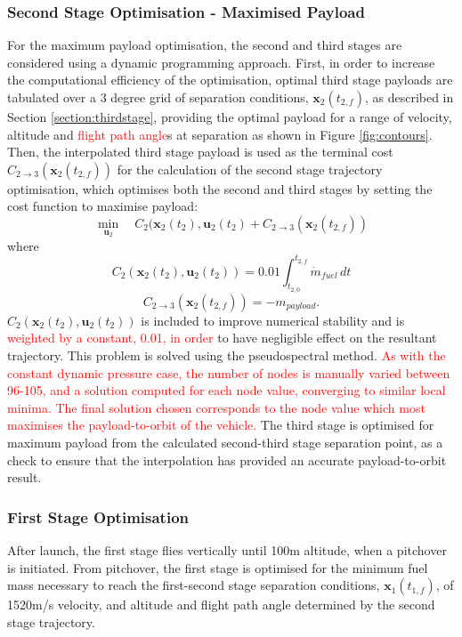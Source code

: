\documentclass[journal]{new-aiaa}
\begin{document}
	 	 \subsubsection{Second Stage Optimisation - Maximised Payload}
	 For the maximum payload optimisation, the second and third stages are considered using a dynamic programming approach. First, in order to increase the computational efficiency of the optimisation, optimal third stage payloads are tabulated  over a 3 degree grid of separation conditions, $\textbf{x}_2(t_{2,f})$, as described in Section \ref{section:thirdstage}, providing the optimal payload for a range of velocity, altitude and \textcolor{red}{flight path angle}s at separation as shown in Figure \ref{fig:contours}. Then, the interpolated third stage payload is used as the terminal cost $C_{2 \rightarrow 3}(\textbf{x}_2(t_{2,f}))$ for the calculation of the second stage trajectory optimisation, which optimises both the second and third stages by setting the cost function to maximise payload:
	  \begin{equation}
	  \min\limits_{\textbf{u}_2} \quad C_2(\textbf{x}_{2}(t_2),\textbf{u}_{2}(t_2) + C_{2 \rightarrow 3}(\textbf{x}_2 (t_{2,f}))
	  \end{equation}
	  where
	  \begin{equation}
	  C_2(\textbf{x}_{2}(t_2),\textbf{u}_{2}(t_2)) = 0.01\int_{t_{2,0}}^{t_{2,f}}\dot{m}_{fuel} \, dt
	  \end{equation}
	  \begin{equation}
	  C_{2 \rightarrow 3}(\textbf{x}_2(t_{2,f})) = -m_{payload}.
	  \end{equation}
	   $C_{2}(\textbf{x}_{2}(t_2),\textbf{u}_{2}(t_2))$ is included to improve numerical stability and is \textcolor{red}{weighted by a constant, 0.01, in order} to have negligible effect on the resultant trajectory.
	 This problem is solved using the pseudospectral method\cite{Ross2004}.  \textcolor{red}{As with the constant dynamic pressure case, the number of nodes is manually varied between 96-105, and a solution computed for each node value, converging to similar local minima. The final solution chosen corresponds to the node value which most maximises the payload-to-orbit of the vehicle.} 
	 The third stage is optimised for maximum payload from the calculated second-third stage separation point, as a check to ensure that the interpolation has provided an accurate payload-to-orbit result. 
	 
 

\subsubsection{First Stage Optimisation}
After launch, the first stage flies vertically until 100m altitude, when a pitchover is initiated. 
From pitchover, the first stage is optimised for the minimum fuel mass necessary to reach the first-second stage separation conditions, $\textbf{x}_1(t_{1,f})$, of 1520m/s velocity, and altitude and flight path angle determined by the second stage trajectory. 
\end{document}
